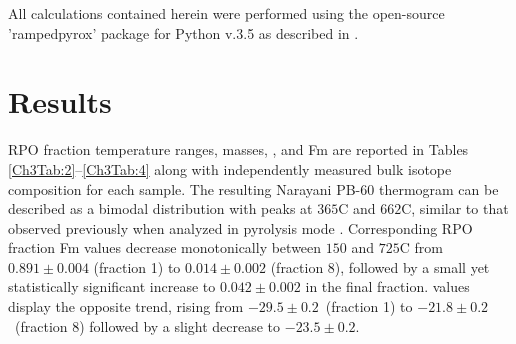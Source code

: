 All calculations contained herein were performed using the open-source 'rampedpyrox' package for Python v.3.5 as described in \citet{Hemingway:bA3-kvLz}.

\section{Results}

RPO fraction temperature ranges,  masses, , and Fm are reported in Tables \ref{Ch3Tab:2}--\ref{Ch3Tab:4} along with independently measured bulk isotope composition for each sample. The resulting Narayani PB-60 thermogram can be described as a bimodal distribution with peaks at $365$\textdegree C and $662$\textdegree C, similar to that observed previously when analyzed in pyrolysis mode \citep[Figure \ref{Ch3Fig:2}A;][]{Rosenheim:2012kh}. Corresponding RPO fraction Fm values decrease monotonically between $150$ and $725$\textdegree C from $0.891 \pm 0.004$ (fraction 1) to $0.014 \pm 0.002$ (fraction 8), followed by a small yet statistically significant increase to $0.042 \pm 0.002$ in the final fraction.  values display the opposite trend, rising from $-29.5 \pm 0.2$\textperthousand\ (fraction 1) to $-21.8 \pm 0.2$\textperthousand\ (fraction 8) followed by a slight decrease to $-23.5 \pm 0.2$\textperthousand. 

